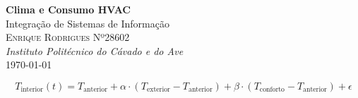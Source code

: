 \documentclass[a4paper, 12pt]{article} %
\renewcommand{\maketitle}{
\begin{titlepage}
\begin{center}
\vspace*{1cm}
{\Huge\textbf{Clima e Consumo HVAC}}\\[0.5cm] %
{\Large Integração de Sistemas de Informação}\\[2cm] %
{\large \textsc{
	Enrique Rodrigues Nº28602}}\\[0.5cm] %
{\textit{Instituto Politécnico do Cávado e do Ave}}\\[1.5cm] %
{\large \today} %
\vfill
\end{center}
\end{titlepage}
}
\begin{document}
\maketitle %











\[
T_{\text{interior}}(t) = T_{\text{anterior}} + \alpha \cdot (T_{\text{exterior}} - T_{\text{anterior}}) + \beta \cdot (T_{\text{conforto}} - T_{\text{anterior}}) + \epsilon
\]
\end{document}
